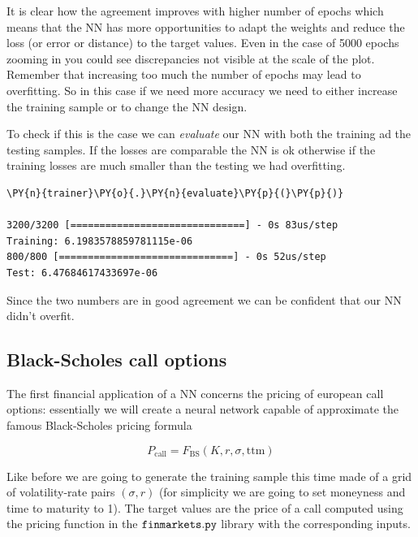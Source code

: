 It is clear how the agreement improves with higher number of epochs
which means that the NN has more opportunities to adapt the weights and
reduce the loss (or error or distance) to the target values. Even in the
case of 5000 epochs zooming in you could see discrepancies not visible
at the scale of the plot. Remember that increasing too much the number
of epochs may lead to overfitting. So in this case if we need more
accuracy we need to either increase the training sample or to change the
NN design.

To check if this is the case we can \emph{evaluate} our NN with both the
training ad the testing samples. If the losses are comparable the NN is
ok otherwise if the training losses are much smaller than the testing we
had overfitting.

\begin{tcolorbox}[breakable, size=fbox, boxrule=1pt, pad at break*=1mm,colback=cellbackground, colframe=cellborder]
\begin{Verbatim}[commandchars=\\\{\}]
\PY{n}{trainer}\PY{o}{.}\PY{n}{evaluate}\PY{p}{(}\PY{p}{)}

3200/3200 [==============================] - 0s 83us/step
Training: 6.1983578859781115e-06
800/800 [==============================] - 0s 52us/step
Test: 6.47684617433697e-06
\end{Verbatim}
\end{tcolorbox}

Since the two numbers are in good agreement we can be confident that our
NN didn't overfit.

\subsection{Black-Scholes call
options}\label{black-scholes-call-options}

The first financial application of a NN concerns the pricing of european
call options: essentially we will create a neural network capable of
approximate the famous Black-Scholes pricing formula

\[ P_\textrm{call} = F_\textrm{BS}(K, r, \sigma, \mathrm{ttm})\]

Like before we are going to generate the training sample this time made
of a grid of volatility-rate pairs \((\sigma, r)\) (for simplicity we
are going to set moneyness and time to maturity to 1). The target values
are the price of a call computed using the pricing function in the
\(\tt{finmarkets.py}\) library with the corresponding inputs.

